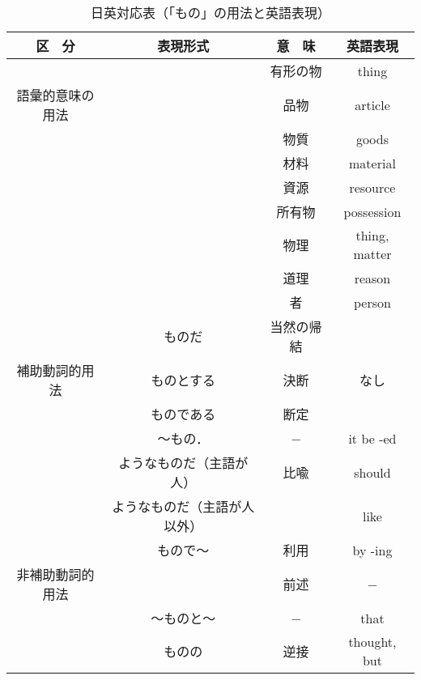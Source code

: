 \begin{table}[htbp]
\caption{日英対応表（「もの」の用法と英語表現）}
\begin{center}
\begin{tabular}{|c|c|c|c|} \hline
区　分 & 表現形式 & 意　味 & 英語表現\\ \hline
 & & 有形の物 & thing\\ \cline{3-4}
語彙的意味の用法 & & 品物 & article\\ \cline{3-4}
 & & 物質 & goods\\ \cline{3-4}
 & & 材料 & material\\ \cline{3-4}
 & & 資源 & resource\\ \cline{3-4}
 & & 所有物 & possession\\ \cline{3-4}
 & & 物理 & thing, matter\\ \cline{3-4}
 & & 道理 & reason\\ \cline{3-4}
 & & 者 & person\\ \hline
 & ものだ & 当然の帰結 & \\ \cline{2-3}
補助動詞的用法 & ものとする & 決断 & なし\\ \cline{2-3}
 & ものである & 断定 & \\ \cline{2-4}
 & 〜もの． & − & it be -ed\\ \cline{2-4}
 & ようなものだ（主語が人） & 比喩 & should\\ \cline{2-2} \cline{4-4}
 & ようなものだ（主語が人以外） &  & like\\ \hline
 & もので〜 & 利用 & by -ing\\ \cline{3-4}
非補助動詞的用法 &  & 前述 & −\\ \cline{2-4}
 & 〜ものと〜 & − & that\\ \cline{2-4}
 & ものの & 逆接 & thought, but\\ \hline
\end{tabular}
\end{center}
\end{table}

